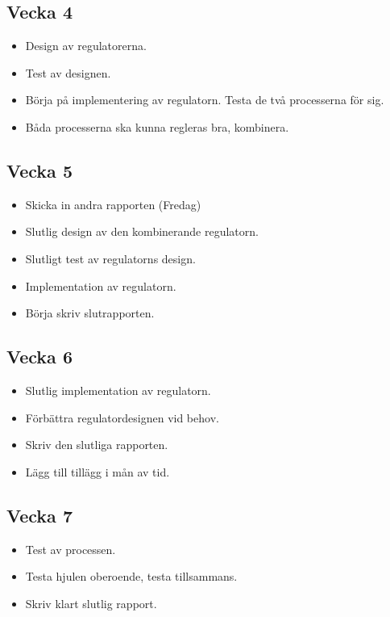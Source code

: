 \documentclass[a4paper]{article}
\begin{document}
    \subsection*{Vecka 4}
    \begin{itemize}
	\item Design av regulatorerna.
    \item Test av designen.
    \item Börja på implementering av regulatorn. Testa de två processerna för sig.
    \item Båda processerna ska kunna regleras bra, kombinera.
	\end{itemize}
    
    \subsection*{Vecka 5}
    \begin{itemize}
    \item Skicka in andra rapporten (Fredag)
    \item Slutlig design av den kombinerande regulatorn.
    \item Slutligt test av regulatorns design.
	\item Implementation av regulatorn.
	\item Börja skriv slutrapporten.    
	\end{itemize}
    
    \subsection*{Vecka 6}
    \begin{itemize}
	\item Slutlig implementation av regulatorn.
    \item Förbättra regulatordesignen vid behov.
    \item Skriv den slutliga rapporten.
    \item Lägg till tillägg i mån av tid.
	\end{itemize}
    
    \subsection*{Vecka 7}
    \begin{itemize}
	\item Test av processen.
    \item Testa hjulen oberoende, testa tillsammans.
    \item Skriv klart slutlig rapport.
	\end{itemize}
\end{document}
